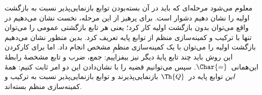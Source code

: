 \documentclass[../../../include/open-logic-section]{subfiles}
\begin{document}
معلوم می‌شود مرحله‌ای که باید در آن بسته‌بودن توابع بازنمایی‌پذیر نسبت
به بازگشت اولیه را نشان دهیم دشوار است. برای پرهیز از این مرحله، نخست
نشان می‌دهیم در واقع می‌توان بدون بازگشت اولیه کار کرد؛ یعنی هر تابع
بازگشتی عمومی را می‌توان تنها با ترکیب و کمینه‌سازی منظم از توابع پایه
تعریف کرد. بدین منظور نشان می‌دهیم بازگشت اولیه را می‌توان با یک
کمینه‌سازی منظمِ مشخص انجام داد. اما برای کارکردن این روش باید چند تابع
پایهٔ دیگر نیز بیفزاییم: جمع، ضرب و تابع مشخصهٔ رابطهٔ
این‌همانی~$\Char{=}$. سپس می‌توانیم قضیه را با نشان‌دادن این دو امر
ثابت کنیم: همهٔ \emph{این} توابع پایه در~$\Th{Q}$ بازنمایی‌پذیرند و
توابع بازنمایی‌پذیر نسبت به ترکیب و کمینه‌سازی منظم بسته‌اند.
\end{document}

